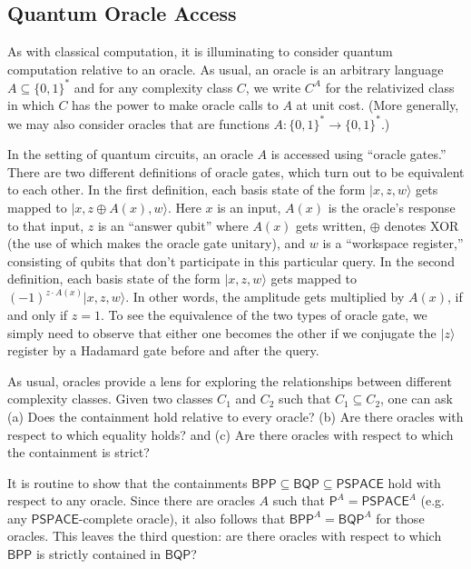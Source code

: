 \documentclass[12pt]{report}
\theoremstyle{plain}
\theoremstyle{definition}
\renewcommand{\ket}[1]{|#1\rangle}
\begin{document}
\subsection{Quantum Oracle Access}

As with classical computation, it is illuminating to consider quantum computation relative to an oracle.
As usual, an oracle is an arbitrary language $A \subseteq \{0,1\}^*$ and for any complexity class
$C$, we write $C^A$ for the relativized class in which $C$ has the power to make oracle
calls to $A$ at unit cost. (More generally, we may also consider oracles that are functions
$A:\{0,1\}^* \longrightarrow \{0,1\}^*$.)

In the setting of quantum circuits, an oracle $A$ is accessed using ``oracle gates.''
There are two different definitions of oracle gates, which turn out to be equivalent to each other.
In the first definition, each basis state of the form $\ket{x,z,w}$ gets mapped to $\ket{x,z\oplus A(x),w}$.
Here $x$ is an input, $A(x)$ is the oracle's response to that input, $z$ is an ``answer qubit'' where $A(x)$ gets
written, $\oplus$ denotes XOR (the use of which makes the oracle gate unitary), and $w$ is a ``workspace register,''
consisting of qubits that don't participate in this particular query.
In the second definition, each basis state of the form $\ket{x,z,w}$ gets mapped to $(-1)^{z\cdot A(x)} \ket{x,z,w}$.
In other words, the amplitude gets multiplied by $A(x)$, if and only if $z=1$.
To see the equivalence of the two types of oracle gate, we simply need to observe that either one becomes the other
if we conjugate the $\ket{z}$ register by a Hadamard gate before and after the query.

As usual, oracles provide a lens for exploring the relationships between different complexity classes.
Given two classes $C_1$ and $C_2$ such that $C_1 \subseteq C_2$, one can ask
(a) Does the containment hold relative to every oracle? (b) Are there
oracles with respect to which equality holds? and (c) Are there oracles with
respect to which the containment  is strict?

It is routine to show that the containments $\mathsf{BPP} \subseteq \mathsf{BQP} \subseteq \mathsf{PSPACE}$
hold with respect to any oracle.  Since there are oracles $A$ such that $\mathsf{P}^A=\mathsf{PSPACE}^A$
(e.g. any $\mathsf{PSPACE}$-complete oracle), it also follows that $\mathsf{BPP}^A=\mathsf{BQP}^A$ for those oracles.
This leaves the third question: are there oracles with respect to which $\mathsf{BPP}$ is
strictly contained in $\mathsf{BQP}$?
\end{document}
